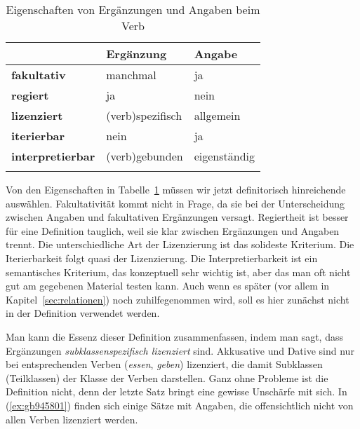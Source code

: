 \begin{table}
  \centering
  \begin{tabular}{lll}
    \lsptoprule
    & \textbf{Ergänzung} & \textbf{Angabe} \\
    \midrule
    \textbf{fakultativ} & manchmal & ja \\
    \textbf{regiert} & ja & nein \\
    \textbf{lizenziert} & (verb)spezifisch & allgemein \\
    \textbf{iterierbar} & nein & ja \\
    \textbf{interpretierbar} & (verb)gebunden & eigenständig \\
    \lspbottomrule
  \end{tabular}
  \caption{Eigenschaften von Ergänzungen und Angaben beim Verb}
  \label{tab:ergang}
\end{table}

Von den Eigenschaften in Tabelle~\ref{tab:ergang} müssen wir jetzt definitorisch hinreichende auswählen.
Fakultativität kommt nicht in Frage, da sie bei der Unterscheidung zwischen Angaben und fakultativen Ergänzungen versagt.
Regiertheit ist besser für eine Definition tauglich, weil sie klar zwischen Ergänzungen und Angaben trennt.
Die unterschiedliche Art der Lizenzierung ist das solideste Kriterium.
Die Iterierbarkeit folgt quasi der Lizenzierung.
Die Interpretierbarkeit ist ein semantisches Kriterium, das konzeptuell sehr wichtig ist, aber das man oft nicht gut am gegebenen Material testen kann.
Auch wenn es später (vor allem in Kapitel~\ref{sec:relationen}) noch zuhilfegenommen wird, soll es hier zunächst nicht in der Definition verwendet werden.


Man kann die Essenz dieser Definition zusammenfassen, indem man sagt, dass Ergänzungen \textit{subklassenspezifisch lizenziert} sind.
Akkusative und Dative sind \zB nur bei entsprechenden Verben (\zB \textit{essen}, \textit{geben}) lizenziert, die damit Subklassen (Teilklassen) der Klasse der Verben darstellen.
Ganz ohne Probleme ist die Definition nicht, denn der letzte Satz bringt eine gewisse Unschärfe mit sich.
In (\ref{ex:gb945801}) finden sich einige Sätze mit Angaben, die offensichtlich nicht von allen Verben lizenziert werden.

